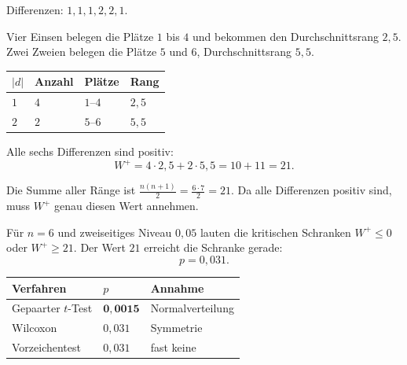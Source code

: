 \begin{merksatz}
Differenzen: $1, 1, 1, 2, 2, 1$.

Vier Einsen belegen die Plätze $1$ bis $4$ und bekommen den Durchschnittsrang $2{,}5$. Zwei Zweien belegen die Plätze $5$ und $6$, Durchschnittsrang $5{,}5$.

\begin{center}
{\small
\renewcommand{\arraystretch}{1.35}
\begin{tabular}{@{}P{1.4cm}P{1.6cm}P{1.6cm}P{1.8cm}@{}}
\toprule
$|d|$ & \textbf{Anzahl} & \textbf{Plätze} & \textbf{Rang}\\
\midrule
$1$ & $4$ & $1$--$4$ & $2{,}5$\\
$2$ & $2$ & $5$--$6$ & $5{,}5$\\
\bottomrule
\end{tabular}}
\end{center}

Alle sechs Differenzen sind positiv:
\[ W^+ = 4 \cdot 2{,}5 + 2 \cdot 5{,}5 = 10 + 11 = 21 . \]

Die Summe aller Ränge ist $\frac{n(n+1)}{2} = \frac{6 \cdot 7}{2} = 21$. Da alle Differenzen positiv sind, muss $W^+$ genau diesen Wert annehmen. \checkmark

Für $n=6$ und zweiseitiges Niveau $0{,}05$ lauten die kritischen Schranken $W^+ \le 0$ oder $W^+ \ge 21$. Der Wert $21$ erreicht die Schranke gerade:
\[ p = 0{,}031 . \]

\begin{center}
\renewcommand{\arraystretch}{1.48}
\begin{tabular}{@{}P{3.2cm}P{1.8cm}P{2.6cm}@{}}
\toprule
\textbf{Verfahren} & $p$ & \textbf{Annahme}\\
\midrule
Gepaarter $t$-Test & $\mathbf{0{,}0015}$ & Normal\-verteilung\\
Wilcoxon & $0{,}031$ & Symmetrie\\
Vorzeichentest & $0{,}031$ & \textcolor{gruen}{fast keine}\\
\bottomrule
\end{tabular}
\end{center}

\begin{center}
\begin{minipage}{0.88\textwidth}
\end{minipage}
\end{center}
\end{merksatz}

